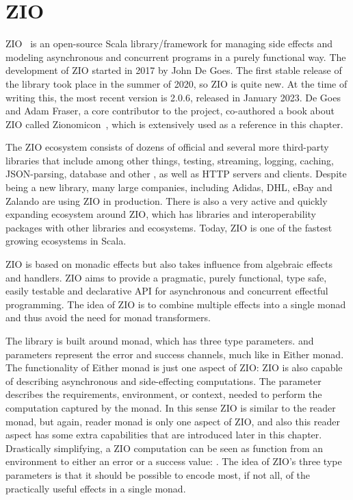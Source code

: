 \chapter{ZIO} \label{zio}

ZIO~\cite{zio} is an open-source Scala library/framework for managing side effects and modeling asynchronous and concurrent programs in a purely functional way. The development of ZIO started in 2017 by John De Goes. The first stable release of the library took place in the summer of 2020, so ZIO is quite new. At the time of writing this, the most recent version is 2.0.6, released in January 2023. De Goes and Adam Fraser, a core contributor to the project, co-authored a book about ZIO called Zionomicon~\cite{zionomicon}, which is extensively used as a reference in this chapter.

The ZIO ecosystem consists of dozens of official and several more third-party libraries that include among other things, testing, streaming, logging, caching, JSON-parsing, database and other , as well as HTTP servers and clients. Despite being a new library, many large companies, including Adidas, DHL, eBay and Zalando are using ZIO in production. There is also a very active and quickly expanding ecosystem around ZIO, which has libraries and interoperability packages with other libraries and ecosystems. Today, ZIO is one of the fastest growing ecosystems in Scala.

ZIO is based on monadic effects but also takes influence from algebraic effects and handlers. ZIO aims to provide a pragmatic, purely functional, type safe, easily testable and declarative API for asynchronous and concurrent effectful programming. The idea of ZIO is to combine multiple effects into a single monad and thus avoid the need for monad transformers.

The library is built around  monad, which has three type parameters.  and  parameters represent the error and success channels, much like in Either monad. The functionality of Either monad is just one aspect of ZIO: ZIO is also capable of describing asynchronous and side-effecting computations. The  parameter describes the requirements, environment, or context, needed to perform the computation captured by the monad. In this sense ZIO is similar to the reader monad, but again, reader monad is only one aspect of ZIO, and also this reader aspect has some extra capabilities that are introduced later in this chapter. Drastically simplifying, a ZIO computation can be seen as function from an environment to either an error or a success value: . The idea of ZIO's three type parameters is that it should be possible to encode most, if not all, of the practically useful effects in a single monad. 

